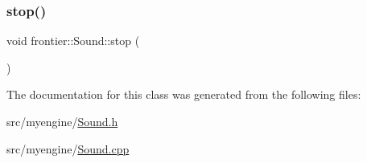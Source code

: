 \mbox{\label{classfrontier_1_1_sound_a29249749885a1bdeff05d120df153207}} 
\subsubsection{\texorpdfstring{stop()}{stop()}}
{\footnotesize\ttfamily void frontier\+::\+Sound\+::stop (\begin{DoxyParamCaption}{ }\end{DoxyParamCaption})}



The documentation for this class was generated from the following files\+:\begin{DoxyCompactItemize}
\item 
src/myengine/\hyperlink{_sound_8h}{Sound.\+h}\item 
src/myengine/\hyperlink{_sound_8cpp}{Sound.\+cpp}\end{DoxyCompactItemize}
